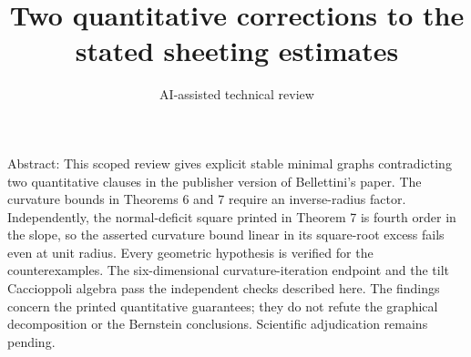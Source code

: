 \documentclass[10pt]{article}
\title{Two quantitative corrections to the stated sheeting estimates}
\author{AI-assisted technical review}
\date{}
\begin{document}
\maketitle
Abstract: This scoped review gives explicit stable minimal graphs contradicting two quantitative clauses in the publisher version of Bellettini’s paper. The curvature bounds in Theorems 6 and 7 require an inverse-radius factor. Independently, the normal-deficit square printed in Theorem 7 is fourth order in the slope, so the asserted curvature bound linear in its square-root excess fails even at unit radius. Every geometric hypothesis is verified for the counterexamples. The six-dimensional curvature-iteration endpoint and the tilt Caccioppoli algebra pass the independent checks described here. The findings concern the printed quantitative guarantees; they do not refute the graphical decomposition or the Bernstein conclusions. Scientific adjudication remains pending.\par
\end{document}
